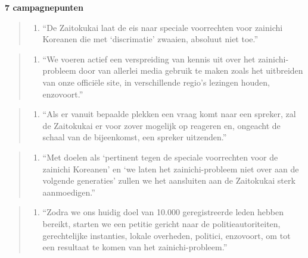 \documentclass[10.5pt,dutch,]{article}
\providecommand{\tightlist}{%
  \setlength{\itemsep}{0pt}\setlength{\parskip}{0pt}}
\begin{document}
\textbf{7 campagnepunten}

\begin{quote}
\begin{enumerate}
\def\labelenumi{\arabic{enumi}.}
\tightlist
\item
  ``De Zaitokukai laat de eis naar speciale voorrechten voor zainichi
  Koreanen die met `discrimatie' zwaaien, absoluut niet toe.''
\end{enumerate}
\end{quote}

\begin{quote}
\begin{enumerate}
\def\labelenumi{\arabic{enumi}.}
\setcounter{enumi}{1}
\tightlist
\item
  ``We voeren actief een verspreiding van kennis uit over het
  zainichi-probleem door van allerlei media gebruik te maken zoals het
  uitbreiden van onze officiële site, in verschillende regio's lezingen
  houden, enzovoort.''
\end{enumerate}
\end{quote}

\begin{quote}
\begin{enumerate}
\def\labelenumi{\arabic{enumi}.}
\setcounter{enumi}{2}
\tightlist
\item
  ``Als er vanuit bepaalde plekken een vraag komt naar een spreker, zal
  de Zaitokukai er voor zover mogelijk op reageren en, ongeacht de
  schaal van de bijeenkomst, een spreker uitzenden.''
\end{enumerate}
\end{quote}

\begin{quote}
\begin{enumerate}
\def\labelenumi{\arabic{enumi}.}
\setcounter{enumi}{3}
\tightlist
\item
  ``Met doelen als `pertinent tegen de speciale voorrechten voor de
  zainichi Koreanen' en `we laten het zainichi-probleem niet over aan de
  volgende generaties' zullen we het aansluiten aan de Zaitokukai sterk
  aanmoedigen.''
\end{enumerate}
\end{quote}

\begin{quote}
\begin{enumerate}
\def\labelenumi{\arabic{enumi}.}
\setcounter{enumi}{4}
\tightlist
\item
  ``Zodra we ons huidig doel van 10.000 geregistreerde leden hebben
  bereikt, starten we een petitie gericht naar de politieautoriteiten,
  gerechtelijke instanties, lokale overheden, politici, enzovoort, om
  tot een resultaat te komen van het zainichi-probleem.''
\end{enumerate}
\end{quote}
\end{document}
